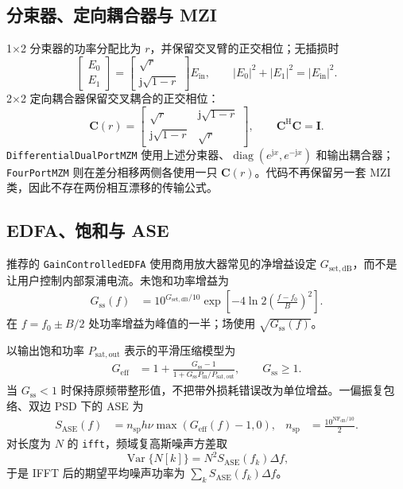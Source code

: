 \documentclass[11pt,a4paper,UTF8]{ctexart}
\newcommand{\pkg}[1]{\texttt{#1}}
\begin{document}
\subsection{分束器、定向耦合器与 MZI}
1$\times$2 分束器的功率分配比为 $r$，并保留交叉臂的正交相位；无插损时
\begin{equation}
\begin{bmatrix}E_0\\E_1\end{bmatrix}
=\begin{bmatrix}\sqrt r\\\mathrm{j}\sqrt{1-r}\end{bmatrix}E_{\mathrm{in}},
\qquad |E_0|^2+|E_1|^2=|E_{\mathrm{in}}|^2.
\end{equation}
2$\times$2 定向耦合器保留交叉耦合的正交相位：
\begin{equation}
\bm C(r)=
\begin{bmatrix}
\sqrt r & \mathrm{j}\sqrt{1-r}\\
\mathrm{j}\sqrt{1-r} & \sqrt r
\end{bmatrix},\qquad \bm C^{\mathrm H}\bm C=\bm I.
\end{equation}
\pkg{DifferentialDualPortMZM} 使用上述分束器、$\operatorname{diag}(e^{\mathrm{j}x},e^{-\mathrm{j}x})$ 和输出耦合器；\pkg{FourPortMZM} 则在差分相移两侧各使用一只 $\bm C(r)$。代码不再保留另一套 MZI 类，因此不存在两份相互漂移的传输公式。

\subsection{EDFA、饱和与 ASE}
推荐的 \pkg{GainControlledEDFA} 使用商用放大器常见的净增益设定 $G_{\mathrm{set,dB}}$，而不是让用户控制内部泵浦电流。未饱和功率增益为
\begin{align}
G_{\mathrm{ss}}(f)&=10^{G_{\mathrm{set,dB}}/10}
\exp\!\left[-4\ln2\left(\frac{f-f_0}{B}\right)^2\right].
\end{align}
在 $f=f_0\pm B/2$ 处功率增益为峰值的一半；场使用 $\sqrt{G_{\mathrm{ss}}(f)}$。

以输出饱和功率 $P_{\mathrm{sat,out}}$ 表示的平滑压缩模型为
\begin{align}
G_{\mathrm{eff}}&=1+\frac{G_{\mathrm{ss}}-1}
{1+G_{\mathrm{ss}}P_{\mathrm{in}}/P_{\mathrm{sat,out}}},
\qquad G_{\mathrm{ss}}\ge 1.
\end{align}
当 $G_{\mathrm{ss}}<1$ 时保持原频带整形值，不把带外损耗错误改为单位增益。一偏振复包络、双边 PSD 下的 ASE 为
\begin{align}
S_{\mathrm{ASE}}(f)&=n_{\mathrm{sp}}h\nu
\max(G_{\mathrm{eff}}(f)-1,0),&
n_{\mathrm{sp}}&=\frac{10^{\mathrm{NF}_{\mathrm{dB}}/10}}{2}.
\end{align}
对长度为 $N$ 的 \pkg{ifft}，频域复高斯噪声方差取
\begin{equation}
\operatorname{Var}\{N[k]\}=N^2S_{\mathrm{ASE}}(f_k)\Delta f,
\end{equation}
于是 IFFT 后的期望平均噪声功率为 $\sum_kS_{\mathrm{ASE}}(f_k)\Delta f$。
\end{document}
